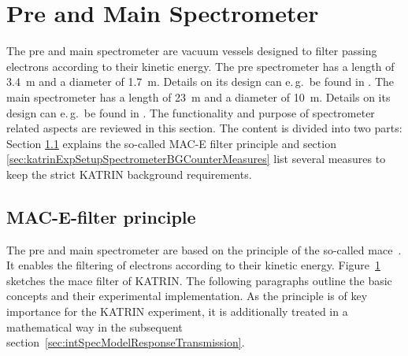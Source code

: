 \section{Pre and Main Spectrometer}
\label{sec:katrinExpSetupSpectrometer}
The pre and main spectrometer are vacuum vessels designed to filter passing electrons according to their kinetic energy. The pre spectrometer has a length of \SI{3.4}{m} and a diameter of \SI{1.7}{m}. Details on its design can e.\,g.~be found in \cite{Valerius2009,Fraenkle2010}. The main spectrometer has a length of \SI{23}{m} and a diameter of \SI{10}{m}. Details on its design can e.\,g.~be found in \cite{Valerius2009, Valerius2004}. The functionality and purpose of spectrometer related aspects are reviewed in this section. The content is divided into two parts: Section \ref{sec:katrinExpSetupSpectrometerMACE} explains the so-called MAC-E filter principle and section \ref{sec:katrinExpSetupSpectrometerBGCounterMeasures} list several measures to keep the strict KATRIN background requirements.

\subsection{MAC-E-filter principle}
\label{sec:katrinExpSetupSpectrometerMACE}
\begin{figure}[t]
	\label{fig:katrinExpSetupSpectrometer}
\end{figure}
The pre and main spectrometer are based on the principle of the so-called \gls{mace}~\cite{Beamson1980}. It enables the filtering of electrons according to their kinetic energy. Figure~\ref{fig:katrinExpSetupSpectrometer} sketches the \gls{mace} filter of KATRIN. The following paragraphs outline the basic concepts and their experimental implementation. As the principle is of key importance for the KATRIN experiment, it is additionally treated in a mathematical way in the subsequent section~\ref{sec:intSpecModelResponseTransmission}.

